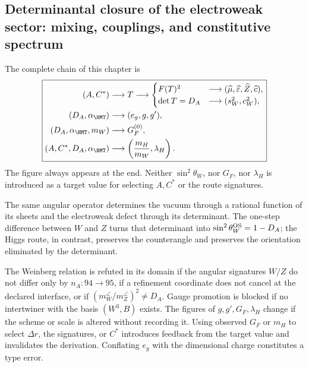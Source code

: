 \subsection{Determinantal closure of the electroweak sector: mixing, couplings, and constitutive spectrum}

The complete chain of this chapter is
\begin{equation}
\label{rm:eq:ew-causal-diagram}
\boxed{
\begin{aligned}
(A,C^*)&\longrightarrow T
\longrightarrow
\begin{cases}
F(T)^2&\longrightarrow
(\widehat\mu,\widehat\varepsilon,\widehat Z,\widehat c),\\
\det T=D_A&\longrightarrow
(s_W^2,c_W^2),
\end{cases}\\
(D_A,\alpha_{\HMT})&\longrightarrow(e_g,g,g'),\\
(D_A,\alpha_{\HMT},m_W)&\longrightarrow G_F^{(0)},\\
(A,C^*,D_A,\alpha_{\HMT})&\longrightarrow
\left(\frac{m_H}{m_W},\lambda_H\right).
\end{aligned}}
\end{equation}
The figure always appears at the end. Neither \(\sin^2\theta_W\), nor
\(G_F\), nor \(\lambda_H\) is introduced as a target value for selecting
\(A,C^*\) or the route signatures.

\begin{keyresult}
The same angular operator determines the vacuum through a rational function
of its sheets and the electroweak defect through its determinant. The
one-step difference between \(W\) and \(Z\) turns that determinant into
\(\sin^2\theta_W^{\rm OS}=1-D_A\); the Higgs route, in contrast, preserves
the counterangle and preserves the orientation eliminated by the determinant.
\end{keyresult}

\begin{falsifier}
The Weinberg relation is refuted in its domain if the angular
signatures \(W/Z\) do not differ only by \(n_A:94\to95\), if a refinement
coordinate does not cancel at the declared interface, or if
\((m_W^{\angle}/m_Z^{\angle})^2\neq D_A\). Gauge promotion is
blocked if no intertwiner with the basis \((W^3,B)\) exists. The figures
of \(g,g',G_F,\lambda_H\) change if the scheme or scale is altered without
recording it. Using observed \(G_F\) or \(m_H\) to select
\(\Delta r\), the signatures, or \(C^*\) introduces feedback from the
target value and invalidates the derivation. Conflating \(e_g\) with the dimensional
charge constitutes a type error.
\end{falsifier}


